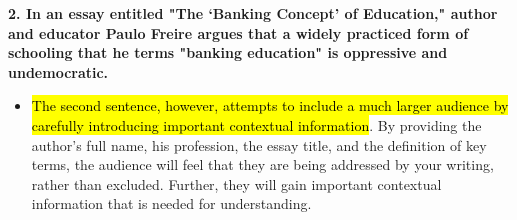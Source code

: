 \textbf{2. In an essay entitled "The `Banking Concept' of Education," author and educator Paulo Freire argues that a widely practiced form of schooling that he terms "banking education" is oppressive and undemocratic.}

\begin{itemize}

\item \hl{The second sentence, however, attempts to include a much larger
audience by carefully introducing important contextual information}. By
providing the author's full name, his profession, the essay title, and the
definition of key terms, the audience will feel that they are being addressed by
your writing, rather than excluded. Further, they will gain important contextual
information that is needed for understanding.

\end{itemize}
